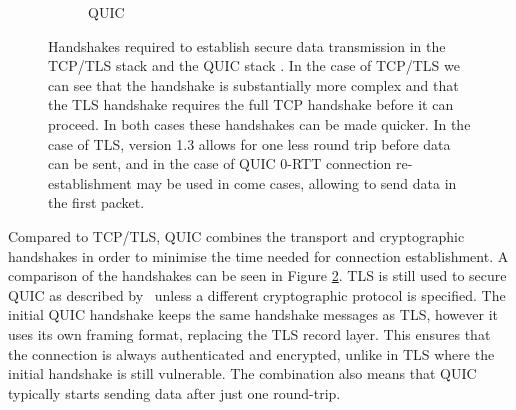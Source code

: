 \begin{figure}[ht]
\begin{center}
\begin{subfigure}[b]{0.45\textwidth}
            \caption{QUIC}
            \label{fig:handshakes:quic}
        \end{subfigure}
        \caption{Handshakes required to establish secure data transmission in the TCP/TLS stack  and the QUIC stack . In the case of TCP/TLS we can see that the handshake is substantially more complex and that the TLS handshake requires the full TCP handshake before it can proceed. In both cases these handshakes can be made quicker. In the case of TLS, version 1.3 allows for one less round trip before data can be sent, and in the case of QUIC 0-RTT connection re-establishment may be used in come cases, allowing to send data in the first packet.}
        \label{fig:handshakes_comparison}
    \end{center}
\end{figure}

Compared to TCP/TLS, QUIC combines the transport and cryptographic handshakes in order to minimise the time needed for connection establishment.
A comparison of the handshakes can be seen in Figure \ref{fig:handshakes_comparison}.
TLS is still used to secure QUIC as described by~\citet{thomson_using_2021} unless a different cryptographic protocol is specified.
The initial QUIC handshake keeps the same handshake messages as TLS, however it uses its own framing format, replacing the TLS record layer.
This ensures that the connection is always authenticated and encrypted, unlike in TLS where the initial handshake is still vulnerable.
The combination also means that QUIC typically starts sending data after just one round-trip.
